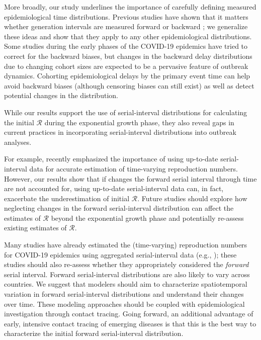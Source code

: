 \documentclass[12pt]{article}
\newcommand{\RR}{\ensuremath{{\mathcal R}}\xspace}
\begin{document}
More broadly, our study underlines the importance of carefully defining measured epidemiological time distributions. 
Previous studies have shown that it matters whether generation
intervals are measured forward or backward \citep{nishiura2010time,champredon2015intrinsic,britton2019estimation};
we generalize these ideas and show that they apply to any other epidemiological distributions.
Some studies during the early phases of the COVID-19 epidemics have tried to correct for the backward biases, but changes in the backward delay distributions due to changing cohort sizes are expected to be a pervasive feature of outbreak dynamics.
Cohorting epidemiological delays by the primary event time can help avoid backward biases (although censoring biases can still exist) as well as detect potential changes in the distribution.

While our results support the use of serial-interval distributions for calculating the initial \RR during the exponential growth phase,  
they also reveal gaps in current practices in incorporating serial-interval distributions into outbreak analyses.


For example, \cite{thompson2019improved} recently emphasized the importance of using up-to-date serial-interval data for accurate estimation of time-varying reproduction numbers.
However, our results show that if changes the forward serial interval through time are not accounted for, using up-to-date serial-interval data can, in fact, exacerbate the underestimation of initial \RR.
Future studies should explore how neglecting changes in the forward serial-interval distribution can affect the estimates of \RR beyond the exponential growth phase and potentially re-assess existing estimates of \RR.

Many studies have already estimated the (time-varying) reproduction numbers for COVID-19 epidemics using aggregated serial-interval data (e.g., \cite{tempvar,du2020serial,pan2020jama,zhang2020evolving});
these studies should also re-assess whether they appropriately considered the \emph{forward} serial interval.
Forward serial-interval distributions are also likely to vary across countries.
We suggest that modelers should aim to characterize spatiotemporal variation in forward serial-interval distributions and understand their changes over time.
These modeling approaches should be coupled with epidemiological investigation through contact tracing. 
Going forward, an additional advantage of early, intensive contact tracing of emerging diseases is that this is the best way to characterize the initial forward serial-interval distribution.
\end{document}
